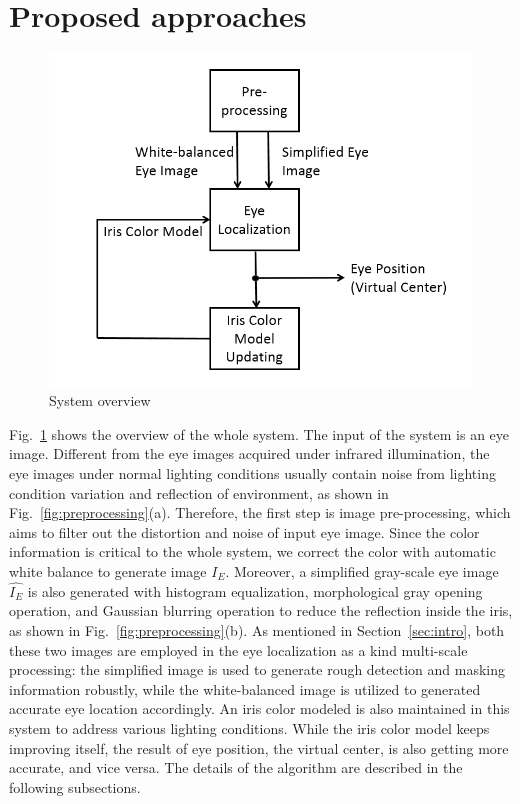 \documentclass[sigconf]{acmart}
\begin{document}
\section{Proposed approaches}
\begin{figure}
\begin{minipage}[b]{1.0\linewidth}
  \centering
  \centerline{\includegraphics[scale=0.6]{../Fig/System_Overview.png}}
\end{minipage}
\caption{System overview}
\label{fig:System overview}
\end{figure}

Fig.~\ref{fig:System overview} shows the overview of the whole system.
The input of the system is an eye image. Different from the eye images acquired under infrared illumination, the eye images under normal lighting conditions usually contain noise from lighting condition variation and reflection of environment, as shown in Fig.~\ref{fig:preprocessing}(a). Therefore, the first step is image pre-processing, which aims to filter out the distortion and noise of input eye image. Since the color information is critical to the whole system, we correct the color with automatic white balance to generate image $I_E$. Moreover, a simplified gray-scale eye image $\hat{I_E}$ is also generated with histogram equalization, morphological gray opening operation, and Gaussian blurring operation to reduce the reflection inside the iris, as shown in Fig.~\ref{fig:preprocessing}(b). As mentioned in Section~\ref{sec:intro}, both these two images are employed in the eye localization as a kind multi-scale processing: the simplified image is used to generate rough detection and masking information robustly, while the white-balanced image is utilized to generated accurate eye location accordingly. An iris color modeled is also maintained in this system to address various lighting conditions. While the iris color model keeps improving itself, the result of eye position, the virtual center, is also getting more accurate, and vice versa. The details of the algorithm are described in the following subsections.
\end{document}
